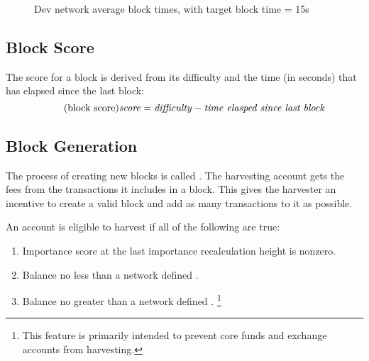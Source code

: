 \begin{figure}
	\caption{Dev network average block times, with target block time = 15s}
\end{figure}

\subsection{Block Score}
\label{sec:blockchain:blockScore}
\label{sec:blockchain:score}

The score for a block is derived from its difficulty and the time (in seconds) that has elapsed since the last block:
\begin{equation}
\tag{block score} \mathit{score} = \mathit{difficulty} - \textit{time elasped since last block}
\end{equation}

\subsection{Block Generation}
\label{sec:blockchain:generation}

The process of creating new blocks is called .
The harvesting account gets the fees from the transactions it includes in a block.
This gives the harvester an incentive to create a valid block and add as many transactions to it as possible.

An account is eligible to harvest if all of the following are true:
\begin{enumerate}
\item{Importance score at the last importance recalculation height is nonzero.}
\item{Balance no less than a network defined .}
\item{Balance no greater than a network defined .}
\footnote{This feature is primarily intended to prevent core funds and exchange accounts from harvesting.}
\end{enumerate}

